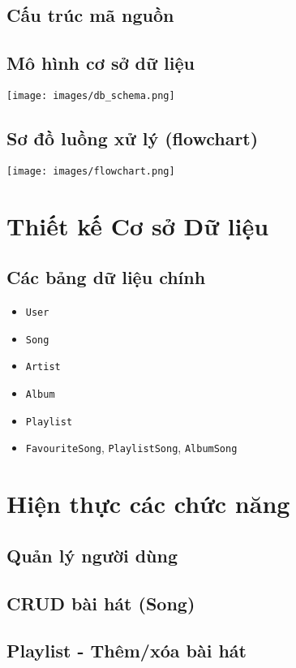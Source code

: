 \documentclass[12pt,a4paper]{report}
\begin{document}
\section{Cấu trúc mã nguồn}
\section{Mô hình cơ sở dữ liệu}
\texttt{[image: images/db\_schema.png]}
\section{Sơ đồ luồng xử lý (flowchart)}
\texttt{[image: images/flowchart.png]}

\chapter{Thiết kế Cơ sở Dữ liệu}
\section{Các bảng dữ liệu chính}
\begin{itemize}
    \item \texttt{User}
    \item \texttt{Song}
    \item \texttt{Artist}
    \item \texttt{Album}
    \item \texttt{Playlist}
    \item \texttt{FavouriteSong}, \texttt{PlaylistSong}, \texttt{AlbumSong}
\end{itemize}

\chapter{Hiện thực các chức năng}
\section{Quản lý người dùng}
\section{CRUD bài hát (Song)}
\section{Playlist - Thêm/xóa bài hát}
\end{document}
